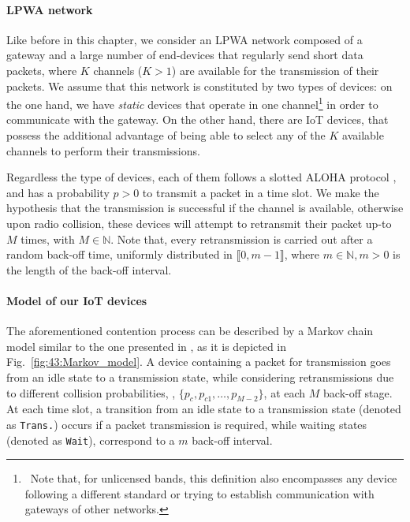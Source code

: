 \paragraph{LPWA network}

Like before in this chapter, we consider an LPWA network composed of a gateway and a large number of end-devices that regularly send short data packets, where $K$ channels ($K>1$) are available for the transmission of their packets.
%
We assume that this network is constituted by two types of devices:
on the one hand, we have \emph{static} devices that operate in one channel\footnote{~Note that, for unlicensed bands, this definition also encompasses any device following a different standard or trying to establish communication with gateways of other networks.} in order to communicate with the gateway.
%
On the other hand, there are  IoT devices, that possess the additional advantage of being able to select any of the $K$ available channels to perform their transmissions.

Regardless the type of devices, each of them follows a slotted ALOHA protocol \cite{Roberts75}, and has a probability $p>0$ to transmit a packet in a time slot.
We make the hypothesis that the transmission is successful if the channel is available, otherwise upon radio collision, these devices will attempt to retransmit their packet up-to $M$ times, with $M \in\mathbb{N}$.
Note that, every retransmission is carried out after a random back-off time, uniformly distributed in $\llbracket 0, m-1 \rrbracket$, where $m \in\mathbb{N}, m>0$ is the length of the back-off interval.


\paragraph{Model of our IoT devices}

The aforementioned contention process can be described by a Markov chain model \cite{Norris98} similar to the one presented in \cite{Yang12}, as it is depicted in Fig.~\ref{fig:43:Markov_model}.
A device containing a packet for transmission goes from an idle state to a transmission state, while considering retransmissions due to different collision probabilities, \ie, $\{p_{c}, p_{c1}, \dots, p_{M-2} \}$, at each $M$ back-off stage.
At each time slot, a transition from an idle state to a transmission state (denoted as \texttt{Trans.}) occurs if a packet transmission is required, while waiting states (denoted as \texttt{Wait}), correspond to a $m$ back-off interval.

